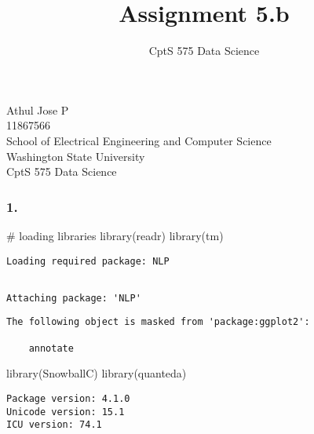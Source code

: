 \documentclass[
  12pt,
  letterpaper,
  DIV=11,
  numbers=noendperiod]{scrartcl}
\title{Assignment 5.b}
\subtitle{CptS 575 Data Science}
\author{}
\date{}
\newenvironment{Shaded}{\begin{snugshade}}{\end{snugshade}}
\newcommand{\CommentTok}[1]{\textcolor[rgb]{0.37,0.37,0.37}{#1}}
\newcommand{\FunctionTok}[1]{\textcolor[rgb]{0.28,0.35,0.67}{#1}}
\newcommand{\NormalTok}[1]{\textcolor[rgb]{0.00,0.23,0.31}{#1}}
\begin{document}
\maketitle


\begin{center}
{\Large Athul Jose P \\ 11867566} \\[0.5cm]
{\large School of Electrical Engineering and Computer Science} \\[0.5cm]
{\large Washington State University} \\[0.5cm]
{\large CptS 575 Data Science} \\[0.5cm]
\end{center}

\newpage

\subsubsection{\texorpdfstring{\textbf{1.}}{1.}}\label{section}

\begin{Shaded}
\begin{Highlighting}[]
\CommentTok{\# loading libraries}
\FunctionTok{library}\NormalTok{(readr)}
\FunctionTok{library}\NormalTok{(tm)}
\end{Highlighting}
\end{Shaded}

\begin{verbatim}
Loading required package: NLP
\end{verbatim}

\begin{verbatim}

Attaching package: 'NLP'
\end{verbatim}

\begin{verbatim}
The following object is masked from 'package:ggplot2':

    annotate
\end{verbatim}

\begin{Shaded}
\begin{Highlighting}[]
\FunctionTok{library}\NormalTok{(SnowballC)}
\FunctionTok{library}\NormalTok{(quanteda)}
\end{Highlighting}
\end{Shaded}

\begin{verbatim}
Package version: 4.1.0
Unicode version: 15.1
ICU version: 74.1
\end{verbatim}
\end{document}
